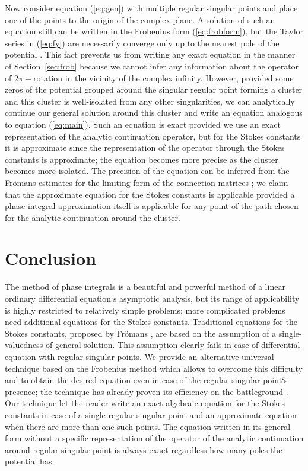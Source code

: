 \documentclass[asy]{iosart2x}
\newcommand\eref[1]{(\ref{#1})}
\newcommand\sref[1]{Section~\ref{#1}}
\begin{document}
Now consider equation \eref{eq:gen} with multiple regular singular points and place one of the points
to the origin of the complex plane. A solution of such an equation still can be written in
the Frobenius form \eref{eq:frobform}, but the Taylor series in \eref{eq:fy}
are necessarily converge only up to the nearest pole of the potential \cite{cbbook}. This fact
prevents us from writing any exact equation in the manner of \sref{sec:frob} because
we cannot infer any information about the operator of $2\pi-$rotation in the vicinity of the complex infinity. 
However, provided some zeros of the potential grouped around the singular regular point forming a cluster and 
this cluster is well-isolated from any other singularities, we can analytically continue our general solution
around this cluster and write an equation analogous to equation \eref{eq:main}. Such an equation
is exact provided we use an exact representation of the analytic continuation operator, but
for the Stokes constants it is approximate since the representation of the operator
through the Stokes constants is approximate; the equation becomes more precise as the cluster
becomes more isolated. The precision of the equation can be inferred from the Fr\"omans estimates 
for the limiting form of the connection matrices \cite{frbook}; we claim that the approximate equation 
for the Stokes constants is applicable provided a phase-integral approximation itself is applicable 
for any point of the path chosen for the analytic continuation around the cluster.
 
\section{Conclusion \label{sec:con}}
The method of phase integrals is a beautiful and powerful method of a linear ordinary 
differential equation`s asymptotic analysis, but its range of applicability is highly 
restricted to relatively simple problems; more complicated problems need additional equations 
for the Stokes constants. Traditional equations for the Stokes constants, proposed by Fr\"omans \cite{frpaper},
are based on the assumption of a single-valuedness of general solution. This assumption clearly fails
in case of differential equation with regular singular points. We provide an alternative universal
technique based on the Frobenius method which allows to overcome this difficulty and to obtain the 
desired equation even in case of the regular singular point`s presence; the technique has already proven
its efficiency on the battleground \cite{kut17}. 
Our technique let the reader write an exact algebraic equation for the Stokes constants in case
of a single regular singular point and an approximate equation when there are more than one such points.
The equation written in its general form without a specific representation of the operator of the analytic
continuation around regular singular point is always exact regardless how many poles the potential has. 
\end{document}
